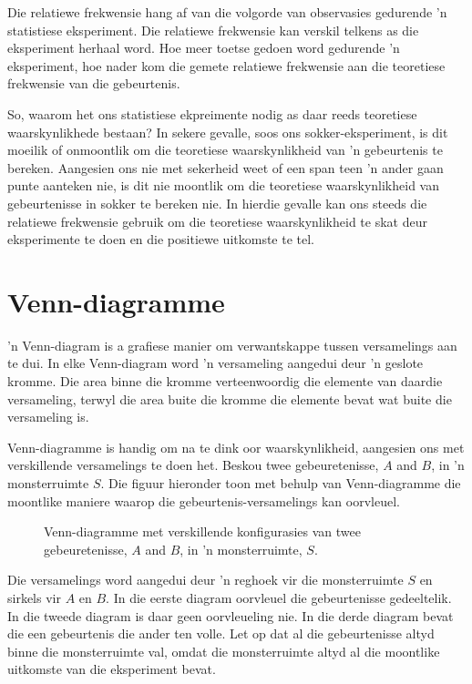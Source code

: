 Die relatiewe frekwensie hang af van die volgorde van observasies gedurende 'n statistiese eksperiment. Die relatiewe frekwensie kan verskil telkens as die eksperiment herhaal word. Hoe meer toetse gedoen word gedurende 'n eksperiment, hoe nader kom die gemete relatiewe frekwensie aan die teoretiese frekwensie van die gebeurtenis.

So, waarom het ons statistiese ekpreimente nodig as daar reeds teoretiese waarskynlikhede bestaan? In sekere gevalle, soos ons sokker-eksperiment, is dit moeilik of onmoontlik om die teoretiese waarskynlikheid van 'n gebeurtenis te bereken. Aangesien ons nie met sekerheid weet of een span teen 'n ander gaan punte aanteken nie, is dit nie moontlik om die teoretiese waarskynlikheid van gebeurtenisse in sokker te bereken nie. In hierdie gevalle kan ons steeds die relatiewe frekwensie gebruik om die teoretiese waarskynlikheid te skat deur eksperimente te doen en die positiewe uitkomste te tel.

\section{Venn-diagramme}
'n Venn-diagram is a grafiese manier om verwantskappe tussen versamelings aan te dui. In elke Venn-diagram word 'n versameling aangedui deur 'n geslote kromme. Die area binne die kromme verteenwoordig die elemente van daardie versameling, terwyl die area buite die kromme die elemente bevat wat buite die versameling is.

Venn-diagramme is handig om na te dink oor waarskynlikheid, aangesien ons met verskillende versamelings te doen het. Beskou twee gebeuretenisse, $A$ and $B$, in 'n monsterruimte $S$. Die figuur hieronder toon met behulp van Venn-diagramme die moontlike maniere waarop die gebeurtenis-versamelings kan oorvleuel.


\begin{figure}[h]
  
  \caption{Venn-diagramme met verskillende konfigurasies van twee gebeuretenisse, $A$ and $B$, in 'n monsterruimte, $S$.}
\end{figure}

Die versamelings word aangedui deur 'n reghoek vir die monsterruimte $S$ en sirkels vir $A$ en $B$. In die eerste diagram oorvleuel die gebeurtenisse gedeeltelik. In die tweede diagram is daar geen oorvleueling nie. In die derde diagram bevat die een gebeurtenis die ander ten volle. Let op dat al die gebeurtenisse altyd binne die monsterruimte val, omdat die monsterruimte altyd al die moontlike uitkomste van die eksperiment bevat.

